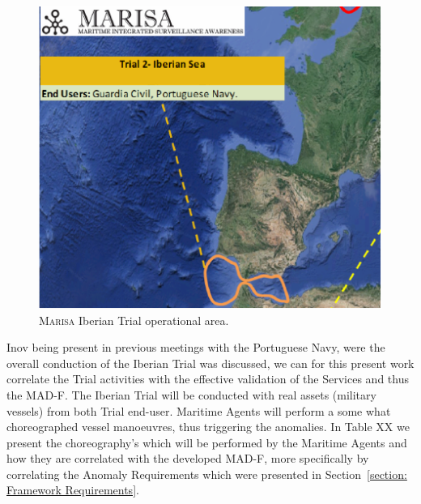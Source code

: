 \begin{figure}[H]
	\centering
	\includegraphics[scale=1.3]{figures/Ch5/IberainTrial.pdf}
    \caption{\textsc{Marisa} Iberian Trial operational area.}
    \label{fig: 5 TrialArea}
\end{figure}


Inov being present in previous meetings with the Portuguese Navy, were the overall conduction of the Iberian Trial was discussed, we can for this present work correlate the Trial activities with the effective validation of the Services and thus the MAD-F.
The Iberian Trial will be conducted with real assets (military vessels) from both Trial end-user. Maritime Agents will perform a some what choreographed vessel manoeuvres, thus triggering the anomalies. In Table XX we present the choreography's which will be performed by the Maritime Agents and how they are correlated with the developed  MAD-F, more specifically by correlating the Anomaly Requirements which were presented in Section~\ref{section: Framework Requirements}. 


